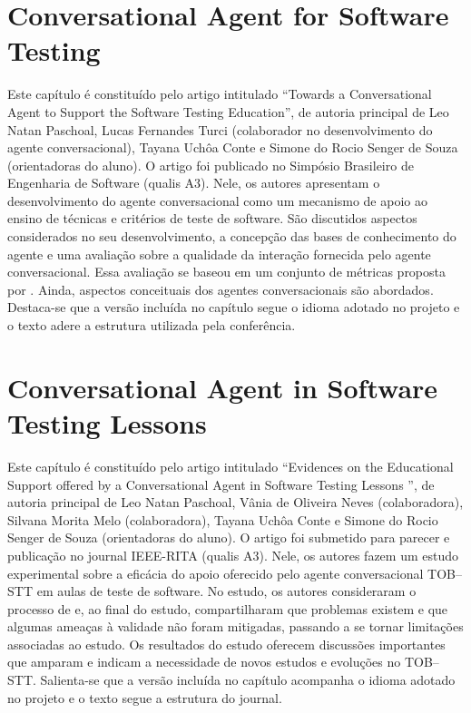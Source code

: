 \documentclass[qualificacao,doutorado]{packages/icmc}
\begin{document}
\chapter{Conversational Agent for Software Testing}\noindent Este capítulo é constituído pelo artigo intitulado ``Towards a Conversational Agent to Support the Software Testing Education'', de autoria principal de Leo Natan Paschoal, Lucas Fernandes Turci (colaborador no desenvolvimento do agente conversacional), Tayana Uchôa Conte e Simone do Rocio Senger de Souza (orientadoras do aluno). O artigo foi publicado no Simpósio Brasileiro de Engenharia de Software (qualis A3). Nele, os autores apresentam o desenvolvimento do agente conversacional como um mecanismo de apoio ao ensino de técnicas e critérios de teste de software. São discutidos aspectos considerados no seu desenvolvimento, a concepção das bases de conhecimento do agente e uma avaliação sobre a qualidade da interação fornecida pelo agente conversacional. Essa avaliação se baseou em um conjunto de métricas proposta por . Ainda,  aspectos conceituais dos agentes conversacionais são abordados. Destaca-se que a versão incluída no capítulo segue o idioma adotado no projeto e o texto adere a estrutura utilizada pela conferência.


\chapter{Conversational Agent in Software Testing Lessons}\noindent Este capítulo é constituído pelo artigo intitulado ``Evidences on the Educational Support offered by a Conversational Agent in Software Testing Lessons '', de autoria principal de Leo Natan Paschoal, Vânia de Oliveira Neves (colaboradora), Silvana Morita Melo (colaboradora),  Tayana Uchôa Conte e Simone do Rocio Senger de Souza (orientadoras do aluno). O artigo foi submetido para parecer e publicação no journal IEEE-RITA (qualis A3). Nele, os autores fazem um estudo experimental sobre a eficácia do apoio oferecido pelo agente conversacional TOB--STT em aulas de teste de software. No estudo, os autores consideraram o processo de  e, ao final do estudo, compartilharam que problemas existem e que algumas ameaças à validade não foram mitigadas, passando a se tornar limitações associadas ao estudo. Os resultados do estudo oferecem discussões importantes que amparam e indicam a necessidade de novos estudos e evoluções no TOB--STT. Salienta-se que a versão incluída no capítulo acompanha o idioma adotado no projeto e o texto segue a estrutura do journal.

\end{document}
